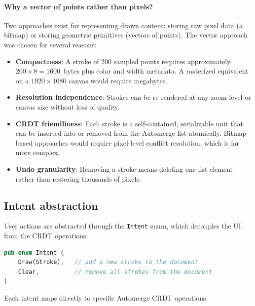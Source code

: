 \documentclass[a4paper,11pt,twoside]{report}
\theoremstyle{definition}
\begin{document}
\paragraph{Why a vector of points rather than pixels?}
Two approaches exist for representing drawn content: storing raw pixel data (a bitmap) or 
storing geometric primitives (vectors of points). The vector approach was chosen for several 
reasons:

\begin{itemize}
    \item \textbf{Compactness}: A stroke of 200 sampled points requires approximately 
    $200 \times 8 = 1600$~bytes plus color and width metadata. A rasterized equivalent on a 
    $1920 \times 1080$ canvas would require megabytes.
    \item \textbf{Resolution independence}: Strokes can be re-rendered at any zoom level or 
    canvas size without loss of quality.
    \item \textbf{CRDT friendliness}: Each stroke is a self-contained, serializable unit that 
    can be inserted into or removed from the Automerge list atomically. Bitmap-based approaches 
    would require pixel-level conflict resolution, which is far more complex.
    \item \textbf{Undo granularity}: Removing a stroke means deleting one list element rather 
    than restoring thousands of pixels.
\end{itemize}

\subsection{Intent abstraction}

User actions are abstracted through the \texttt{Intent} enum, which decouples the UI from 
the CRDT operations:

\begin{lstlisting}[language=Rust]
pub enum Intent {
    Draw(Stroke),   // add a new stroke to the document
    Clear,          // remove all strokes from the document
}
\end{lstlisting}

Each intent maps directly to specific Automerge CRDT operations:
\end{document}
